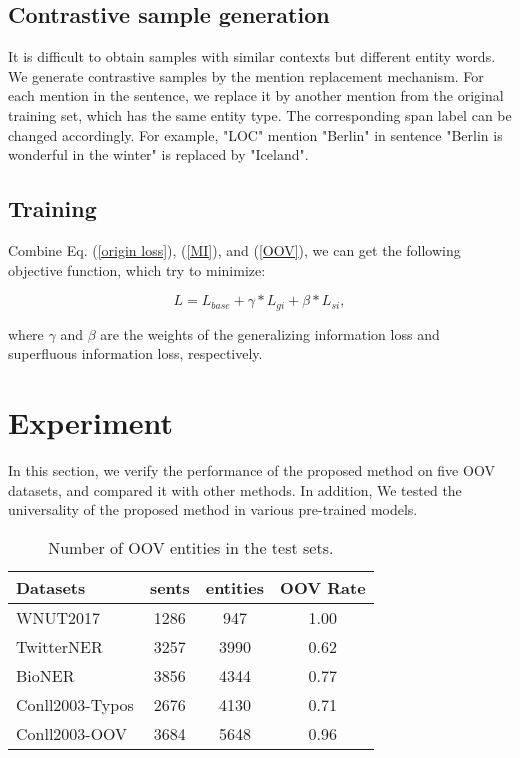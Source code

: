 \documentclass[11pt]{article}
\begin{document}
 \subsection{Contrastive sample generation}
It is difficult to obtain samples with similar contexts but different entity words. We generate contrastive samples by the mention replacement mechanism\cite{dai2020analysis}. For each mention in the sentence, we replace it by another mention from the original training set, which has the same entity type. The corresponding span label can be changed accordingly. For example, "LOC" mention "Berlin" in sentence "Berlin is wonderful in the winter" is replaced by "Iceland". 

\subsection{Training}
Combine Eq. (\ref{origin loss}), (\ref{MI}), and (\ref{OOV}), we can get the following objective function, which try to minimize:

\begin{equation}
    L = L_{base} + \gamma * L_{gi} + \beta * L_{si},
\end{equation} 

where $\gamma$ and $\beta$ are the weights of the generalizing information loss and superfluous information loss, respectively.


\section{Experiment}\label{Experiments}
In this section, we verify the performance of the proposed method on five OOV datasets, and compared it with other methods. In addition, We tested the universality of the proposed method in various pre-trained models.




\begin{table}[t]
\begin{tabular}{lccc}
\hline
\hline
Datasets        & \multicolumn{1}{l}{sents} & \multicolumn{1}{l}{entities} & \multicolumn{1}{l}{OOV Rate} \\ \hline
WNUT2017        & 1286               &  947                   & 1.00                            \\ \hline
TwitterNER      & 3257              & 3990                  & 0.62                   \\ \hline
BioNER          & 3856              &  4344                 & 0.77                      \\ \hline
Conll2003-Typos & 2676                      & 4130                         & 0.71                      \\ \hline
Conll2003-OOV   & 3684                      & 5648                         & 0.96                      \\ \hline
     

\end{tabular}
\caption{Number of OOV entities in the test sets. }
\label{dataset}
\end{table}
\end{document}
